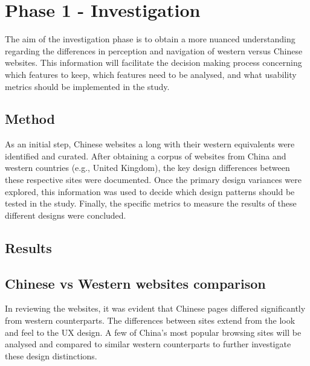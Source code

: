 
\chapter{Phase 1 - Investigation} %

\label{Chapter4} %

The aim of the investigation phase is to obtain a more nuanced understanding regarding the differences in perception and navigation of western versus Chinese websites. This information will facilitate the decision making process concerning which features to keep, which features need to be analysed, and what usability metrics should be implemented in the study. 

\section{Method}
As an initial step, Chinese websites a long with their western equivalents were identified and curated. After obtaining a corpus of websites from China and western countries (e.g., United Kingdom), the key design differences between these respective sites were documented. Once the primary design variances were explored, this information was used to decide which design patterns should be tested in the study. Finally, the specific metrics to measure the results of these different designs were concluded. 


\section{Results}
\section{Chinese vs Western websites comparison}
In reviewing the websites, it was evident that Chinese pages differed significantly from western  counterparts. The differences between sites extend from the look and feel to the UX design. A few of China's most popular browsing sites will be analysed and compared to similar western counterparts to further investigate these design distinctions. 
 

